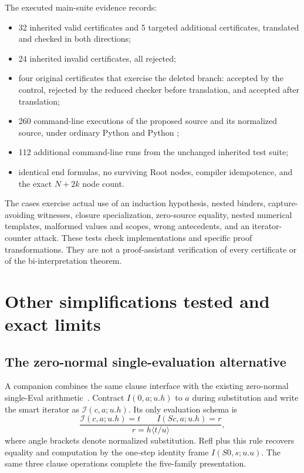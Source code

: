 \documentclass[11pt,letterpaper]{article}
\theoremstyle{definition}
\newcommand{\file}[1]{\texttt{\detokenize{#1}}}
\begin{document}
The executed main-suite evidence records:
\begin{itemize}
\item 32 inherited valid certificates and 5 targeted additional
      certificates, translated and checked in both directions;
\item 24 inherited invalid certificates, all rejected;
\item four original certificates that exercise the deleted branch:
      accepted by the control, rejected by the reduced checker
      before translation, and accepted after translation;
\item 260 command-line executions of the proposed source and its
      normalized source, under ordinary Python and Python \file{-O};
\item 112 additional command-line runs from the unchanged inherited
      test suite;
\item identical end formulas, no surviving Root nodes, compiler
      idempotence, and the exact $N+2k$ node count.
\end{itemize}
The cases exercise actual use of an induction hypothesis, nested
binders, capture-avoiding witnesses, closure specialization,
zero-source equality, nested numerical templates, malformed
values and scopes, wrong antecedents, and an iterator-counter
attack. These tests check implementations and specific proof
transformations. They are not a proof-assistant verification
of every certificate or of the bi-interpretation theorem.

\section{Other simplifications tested and exact limits}
\label{sec:limits}

\subsection{The zero-normal single-evaluation alternative}

A companion combines the same clause interface with the existing
zero-normal single-Eval arithmetic~\cite{identity,zero}. Contract
$I(0,a;u.h)$ to $a$ during substitution and write the smart
iterator as $\mathcal I(c,a;u.h)$. Its only evaluation schema is
\[
 \frac{\mathcal I(c,a;u.h)=t\qquad I(Sc,a;u.h)=r}
      {r=h\langle t/u\rangle},
\]
where angle brackets denote normalized substitution. Refl plus
this rule recovers equality and computation by the one-step
identity frame $I(S0,s;u.u)$. The same three clause operations
complete the five-family presentation.
\end{document}
